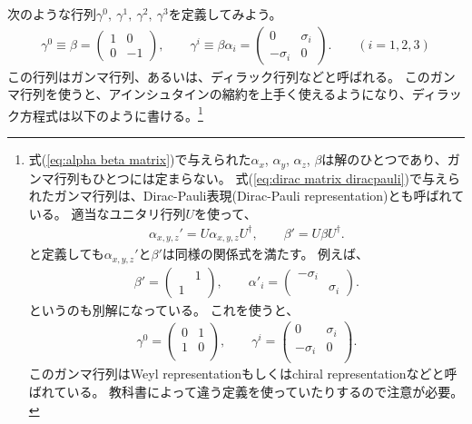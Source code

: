 \documentclass[10pt,a4paper]{jarticle}
\begin{document}
次のような行列$\gamma^0,~\gamma^1,~\gamma^2,~\gamma^3$を定義してみよう。
\begin{align}
\gamma^0 \equiv \beta = \left(\begin{array}{cc}
1 & 0 \\
0 & -1
\end{array}\right), \qquad
\gamma^i \equiv \beta \alpha_i = \left(\begin{array}{cc}
0 & \sigma_i \\
-\sigma_i & 0
\end{array}\right). \qquad (i = 1,2,3)
\label{eq:dirac matrix diracpauli}
\end{align}
この行列はガンマ行列、あるいは、ディラック行列などと呼ばれる。
このガンマ行列を使うと、アインシュタインの縮約を上手く使えるようになり、ディラック方程式は以下のように書ける。\footnote{
式(\ref{eq:alpha beta matrix})で与えられた$\alpha_x$, $\alpha_y$, $\alpha_z$, $\beta$は解のひとつであり、ガンマ行列もひとつには定まらない。
式(\ref{eq:dirac matrix diracpauli})で与えられたガンマ行列は、Dirac-Pauli表現(Dirac-Pauli representation)とも呼ばれている。
適当なユニタリ行列$U$を使って、
\begin{align}
\alpha_{x,y,z}' = U \alpha_{x,y,z} U^\dagger, \qquad
\beta' = U \beta U^\dagger.
\end{align}
と定義しても$\alpha_{x,y,z}'$と$\beta'$は同様の関係式を満たす。
%
例えば、
\begin{align}
\beta' = \left(\begin{array}{cc}
 & 1 \\
1 & 
\end{array}\right), \qquad
\alpha'_i = \left(\begin{array}{cc}
-\sigma_i &  \\
 & \sigma_i
\end{array}\right).
\end{align}
というのも別解になっている。
%
これを使うと、
\begin{align}
\gamma^0 = \left(\begin{array}{cc}
0 & 1 \\
1 & 0 \\
\end{array}\right), \qquad
\gamma^i = \left(\begin{array}{cc}
0 & \sigma_i \\
-\sigma_i & 0 \\
\end{array}\right).
\label{eq:dirac matrix weyl}
\end{align}
このガンマ行列はWeyl representationもしくはchiral representationなどと呼ばれている。
%
教科書によって違う定義を使っていたりするので注意が必要。}
\end{document}
